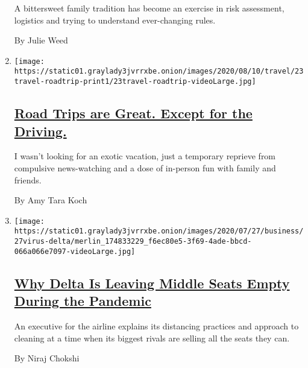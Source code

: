 \begin{enumerate}
  A bittersweet family tradition has become an exercise in risk
  assessment, logistics and trying to understand ever-changing rules.

  By Julie Weed
\item
  \texttt{[image: https://static01.graylady3jvrrxbe.onion/images/2020/08/10/travel/23travel-roadtrip-print1/23travel-roadtrip-videoLarge.jpg]}

  \hypertarget{road-trips-are-great-except-for-the-driving}{%
  \subsection{\texorpdfstring{\href{/2020/07/24/travel/virus-road-trip.html}{Road
  Trips are Great. Except for the
  Driving.}}{Road Trips are Great. Except for the Driving.}}\label{road-trips-are-great-except-for-the-driving}}

  I wasn't looking for an exotic vacation, just a temporary reprieve
  from compulsive news-watching and a dose of in-person fun with family
  and friends.

  By Amy Tara Koch
\item
  \texttt{[image: https://static01.graylady3jvrrxbe.onion/images/2020/07/27/business/27virus-delta/merlin\_174833229\_f6ec80e5-3f69-4ade-bbcd-066a066e7097-videoLarge.jpg]}

  \hypertarget{why-delta-is-leaving-middle-seats-empty-during-the-pandemic}{%
  \subsection{\texorpdfstring{\href{/2020/07/27/business/delta-airlines-bill-lentsch.html}{Why
  Delta Is Leaving Middle Seats Empty During the
  Pandemic}}{Why Delta Is Leaving Middle Seats Empty During the Pandemic}}\label{why-delta-is-leaving-middle-seats-empty-during-the-pandemic}}

  An executive for the airline explains its distancing practices and
  approach to cleaning at a time when its biggest rivals are selling all
  the seats they can.

  By Niraj Chokshi
\end{enumerate}

